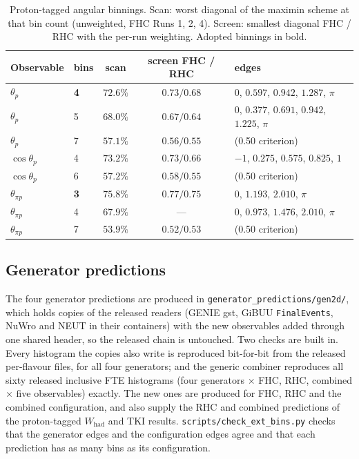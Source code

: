 \begin{table}[H]
  \centering
  \caption{Proton-tagged angular binnings. Scan: worst diagonal of the maximin scheme at that bin
    count (unweighted, FHC Runs 1, 2, 4). Screen: smallest diagonal FHC / RHC with the per-run
    weighting. Adopted binnings in bold.}
  \label{tab:newbins}
  \small
  \begin{tabular}{llccl}
    \toprule
    Observable & bins & scan & screen FHC / RHC & edges \\
    \midrule
    \textbf{$\theta_p$} & \textbf{4} & $\mathbf{72.6\%}$ & $\mathbf{0.73/0.68}$ & $0$, $0.597$, $0.942$, $1.287$, $\pi$ \\
    $\theta_p$ & 5 & $68.0\%$ & $0.67/0.64$ & $0$, $0.377$, $0.691$, $0.942$, $1.225$, $\pi$ \\
    $\theta_p$ & 7 & $57.1\%$ & $0.56/0.55$ & (0.50 criterion) \\
    $\cos\theta_p$ & 4 & $73.2\%$ & $0.73/0.66$ & $-1$, $0.275$, $0.575$, $0.825$, $1$ \\
    $\cos\theta_p$ & 6 & $57.2\%$ & $0.58/0.55$ & (0.50 criterion) \\
    \textbf{$\theta_{\pi p}$} & \textbf{3} & $\mathbf{75.8\%}$ & $\mathbf{0.77/0.75}$ & $0$, $1.193$, $2.010$, $\pi$ \\
    $\theta_{\pi p}$ & 4 & $67.9\%$ & --- & $0$, $0.973$, $1.476$, $2.010$, $\pi$ \\
    $\theta_{\pi p}$ & 7 & $53.9\%$ & $0.52/0.53$ & (0.50 criterion) \\
    \bottomrule
  \end{tabular}
\end{table}

\subsection{Generator predictions}

The four generator predictions are produced in \texttt{generator\_predictions/gen2d/}, which holds
copies of the released readers (GENIE gst, GiBUU \texttt{FinalEvents}, NuWro and NEUT in their
containers) with the new observables added through one shared header, so the released chain is
untouched. Two checks are built in. Every histogram the copies also write is reproduced bit-for-bit
from the released per-flavour files, for all four generators; and the generic combiner reproduces all
sixty released inclusive FTE histograms (four generators $\times$ FHC, RHC, combined $\times$ five
observables) exactly. The new ones are produced for FHC, RHC and the combined configuration, and also
supply the RHC and combined predictions of the proton-tagged $W_\mathrm{had}$ and TKI results.
\texttt{scripts/check\_ext\_bins.py} checks that the generator edges and the configuration edges agree
and that each prediction has as many bins as its configuration.

